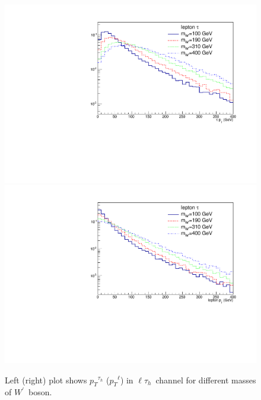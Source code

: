\documentclass[preprint,showpacs,preprintnumbers]{revtex4}
\newcommand{\wprime}{\ensuremath{W^\prime}~}
\newcommand{\Tau}{\ensuremath{\tau_h}}
\newcommand{\lepTau}{\ensuremath{\ell\tau_h}}
\newcommand{\pt}{\ensuremath{p_T}}
\begin{document}
\begin{figure}[htb]
	\centering
	\includegraphics*[width=.45\textwidth]{Pt_lh_tau.pdf}
	\hspace{3mm}
	\includegraphics*[width=.45\textwidth]{Pt_lh_lep.pdf}
	\caption{Left (right) plot shows $\pt^{\Tau}$ ($\pt^{\ell}$) in \lepTau ~channel for different masses of \wprime boson.}
	\label{fig:pt-lh}
\end{figure}
\end{document}
